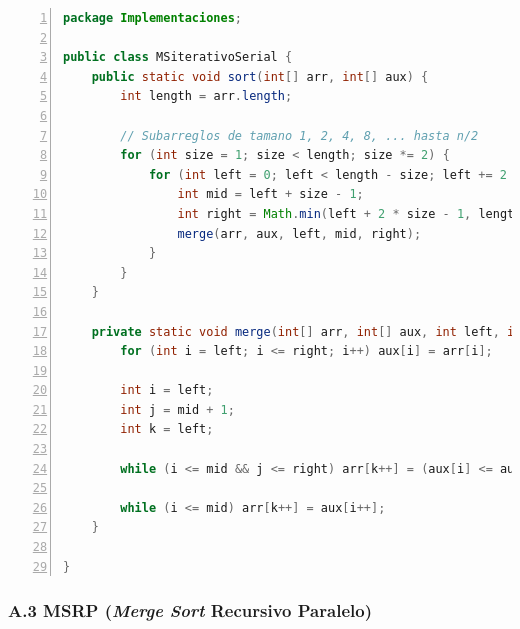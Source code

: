 \documentclass[titlepage]{article}
\begin{document}
	\begin{lstlisting}[language=java, frame=single, numbers=left, float=h]
package Implementaciones;

public class MSiterativoSerial {
	public static void sort(int[] arr, int[] aux) {
		int length = arr.length;
		
		// Subarreglos de tamano 1, 2, 4, 8, ... hasta n/2
		for (int size = 1; size < length; size *= 2) {
			for (int left = 0; left < length - size; left += 2 * size) {
				int mid = left + size - 1;
				int right = Math.min(left + 2 * size - 1, length - 1);
				merge(arr, aux, left, mid, right);
			}
		}
	}
	
	private static void merge(int[] arr, int[] aux, int left, int mid, int right) {
		for (int i = left; i <= right; i++) aux[i] = arr[i];
		
		int i = left;       
		int j = mid + 1;    
		int k = left;       
		
		while (i <= mid && j <= right) arr[k++] = (aux[i] <= aux[j])? aux[i++] : aux[j++];
		
		while (i <= mid) arr[k++] = aux[i++];
	}
	
}
	\end{lstlisting}


\newpage

\subsubsection*{A.3 MSRP (\textit{Merge Sort} Recursivo Paralelo)}
\end{document}
